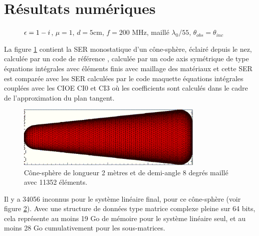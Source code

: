 \section{Résultats numériques}

  \begin{figure}[!hbt]
    \centering
    
    \caption[SER monostatique d'un cône-sphère calculée par un code EI]{\(\epsilon = 1 - i\), \(\mu = 1\), \(d = 5\)cm, \( f =  200\) MHz, maillé \(\lambda_0/55\), \(\theta_{obs}=\theta_{inc}\)}
    \label{fig:ser:cone-sphere-mono-M1}
  \end{figure}

  La figure \ref{fig:ser:cone-sphere-mono-M1} contient la SER monostatique d'un cône-sphère, éclairé depuis le nez, calculée par un code de référence , calculée par un code axis symétrique de type équations intégrales avec éléments finis avec maillage des matériaux et cette SER est comparée avec les SER calculées par le code maquette équations intégrales couplées avec les CIOE CI0 et CI3 où les coefficients sont calculés dans le cadre de l'approximation du plan tangent.

  \begin{figure}[!hbt]
    \centering
    \includegraphics[width=0.8\textwidth]{images/cone.png}
    \caption{Cône-sphère de longueur 2 mètres et de demi-angle 8 degrés maillé avec 11352 éléments.}
    \label{fig:obj:cone-sphere}
  \end{figure}

  Il y a 34056 inconnus pour le système linéaire final, pour ce cône-sphère (voir figure \ref{fig:obj:cone-sphere}).
  Avec une structure de données type matrice complexe pleine sur 64 bits, cela représente au moins 19 Go de mémoire pour le système linéaire seul, et au moins 28 Go cumulativement pour les sous-matrices.



